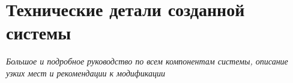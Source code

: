 \chapter{Технические детали созданной системы}

\textit{Большое и подробное руководство по всем компонентам системы, описание узких мест и рекомендации к модификации}